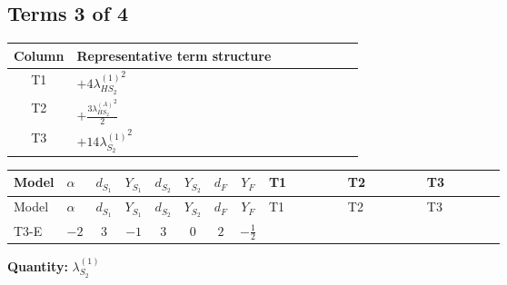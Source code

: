 \documentclass[8pt]{article}
\begin{document}
\begin{landscape}
\subsection*{Terms 3 of 4}
\begin{center}
\begin{tabular}{@{}c >{\raggedright\arraybackslash}p{0.82\linewidth}@{}}
\toprule
Column & Representative term structure \\
\midrule
T1 & \(\displaystyle +4 {\lambda_{HS_2}^{(1)}}^2\) \\
\midrule
T2 & \(\displaystyle +\frac{3 {\lambda_{HS_2}^{(A)}}^2}{2}\) \\
\midrule
T3 & \(\displaystyle +14 {\lambda_{S_2}^{(1)}}^2\) \\
\midrule
\bottomrule
\end{tabular}
\end{center}
\smallskip
\tiny
\begin{longtable}{@{}llcccccc >{\raggedright\arraybackslash}p{0.21\linewidth} >{\raggedright\arraybackslash}p{0.21\linewidth} >{\raggedright\arraybackslash}p{0.21\linewidth}@{}}
\toprule
Model & $\alpha$ & $d_{S_1}$ & $Y_{S_1}$ & $d_{S_2}$ & $Y_{S_2}$ & $d_F$ & $Y_F$ & T1 & T2 & T3 \\
\midrule
\endfirsthead
\toprule
Model & $\alpha$ & $d_{S_1}$ & $Y_{S_1}$ & $d_{S_2}$ & $Y_{S_2}$ & $d_F$ & $Y_F$ & T1 & T2 & T3 \\
\midrule
\endhead
T3-E & $-2$ & $3$ & $-1$ & $3$ & $0$ & $2$ & $-\frac{1}{2}$ & \scriptsize\adjustbox{max width=\linewidth}{$\begin{gathered} +4 {\lambda_{HS_2}^{(1)}}^2\end{gathered}$} & \scriptsize\adjustbox{max width=\linewidth}{$\begin{gathered} +\frac{3 {\lambda_{HS_2}^{(A)}}^2}{2}\end{gathered}$} & \scriptsize\adjustbox{max width=\linewidth}{$\begin{gathered} +14 {\lambda_{S_2}^{(1)}}^2\end{gathered}$} \\
\midrule
\bottomrule
\end{longtable}
\clearpage
\noindent\textbf{Quantity: }$\lambda_{S_2}^{(1)}$\par\smallskip

\end{landscape}
\end{document}
